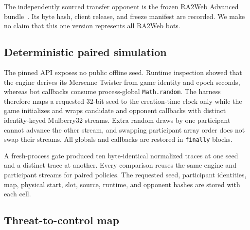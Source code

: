 The independently sourced transfer opponent is the frozen RA2Web Advanced
bundle~\cite{ra2web2026bot}. Its byte hash, client release, and freeze
manifest are recorded. We make no claim that this one version represents all
RA2Web bots.

\subsection{Deterministic paired simulation}

The pinned API exposes no public offline seed. Runtime inspection showed that
the engine derives its Mersenne Twister from game identity and epoch seconds,
whereas bot callbacks consume process-global \texttt{Math.random}. The harness
therefore maps a requested 32-bit seed to the creation-time clock only while
the game initializes and wraps candidate and opponent callbacks with distinct
identity-keyed Mulberry32 streams. Extra random draws by one participant cannot
advance the other stream, and swapping participant array order does not swap
their streams. All globals and callbacks are restored in \texttt{finally}
blocks.

A fresh-process gate produced ten byte-identical normalized traces at one seed
and a distinct trace at another. Every comparison reuses the same engine and
participant streams for paired policies. The requested seed, participant
identities, map, physical start, slot, source, runtime, and opponent hashes are
stored with each cell.

\subsection{Threat-to-control map}

